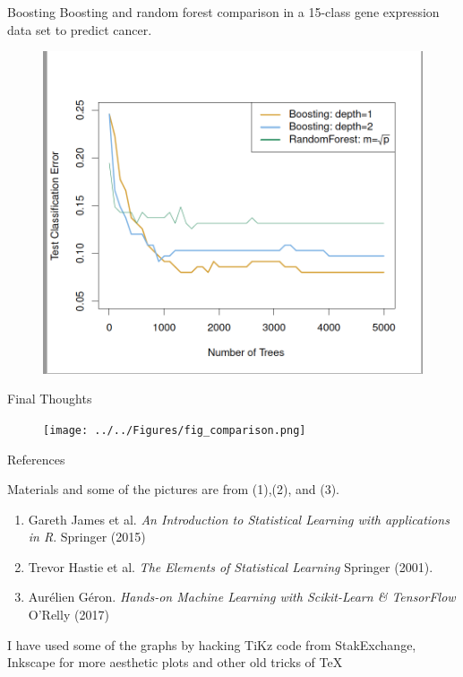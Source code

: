 \documentclass{beamer}
\begin{document}
\begin{frame}{Boosting}
	Boosting and random forest comparison in a 15-class gene expression data set to predict cancer.
	 \begin{figure}[h]
		\centering
		\includegraphics[scale=0.35]{../../Figures/fig_boosting.png}
	\end{figure}
	
\end{frame}

\begin{frame}{Final Thoughts}
	
 \begin{figure}[h]
	\centering
	\texttt{[image: ../../Figures/fig\_comparison.png]}
\end{figure}
\end{frame}

\begin{frame}{References}
	
	Materials and some of the pictures are from (1),(2), and (3).
	\begin{enumerate}
		\item Gareth James et al. {\it An Introduction to Statistical Learning with applications in R}. Springer (2015)
		\item Trevor Hastie et al. {\it The Elements of Statistical Learning } Springer (2001). 
		\item Aur\'elien G\'eron. {\it Hands-on Machine Learning with Scikit-Learn \& TensorFlow} O'Relly (2017)
		
	\end{enumerate}	
	
	I have used some of the graphs by hacking TiKz code from StakExchange, Inkscape for more aesthetic plots and other old tricks of \TeX
\end{frame}	
\end{document}
